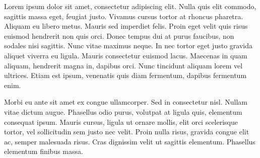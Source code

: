 
\def\sender{Ondřej Profant  \\
Předseda krajské organizace}
\def\sendera{Česká pirátská strana  \\
Řehořova 943\slash 19,   \\
130 00, Praha 3}
\def\recipient{Magistrá hl. m. Prahy  \\
Mariánské náměstí 2  \\
Praha 1}
\def\open{Vážený pane,}
\def\close{s pozdravem}


Lorem ipsum dolor sit amet, consectetur adipiscing elit. Nulla quis elit commodo, sagittis massa eget, feugiat justo. Vivamus cursus tortor at rhoncus pharetra. Aliquam eu libero metus. Mauris sed imperdiet felis. Proin eget velit quis risus euismod hendrerit non quis orci. Donec tempus dui at purus faucibus, non sodales nisi sagittis. Nunc vitae maximus neque. In nec tortor eget justo gravida aliquet viverra eu ligula. Mauris consectetur euismod lacus. Maecenas in quam aliquam, hendrerit magna in, dapibus orci. Nunc tincidunt aliquam lorem vel ultrices. Etiam est ipsum, venenatis quis diam fermentum, dapibus fermentum enim.

Morbi eu ante sit amet ex congue ullamcorper. Sed in consectetur nisl. Nullam vitae dictum augue. Phasellus odio purus, volutpat at ligula quis, elementum consequat ipsum. Mauris cursus, ligula ut ornare mollis, elit orci scelerisque tortor, vel sollicitudin sem justo nec velit. Proin nulla risus, gravida congue elit ac, semper malesuada risus. Cras dignissim velit ut sagittis elementum. Phasellus elementum finibus massa.




